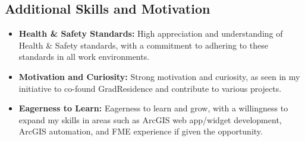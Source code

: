 \documentclass{article}
\begin{document}
\subsection*{Additional Skills and Motivation}
\begin{itemize}
    \item \textbf{Health \& Safety Standards:} High appreciation and understanding of Health \& Safety standards, with a commitment to adhering to these standards in all work environments.
    \item \textbf{Motivation and Curiosity:} Strong motivation and curiosity, as seen in my initiative to co-found GradResidence and contribute to various projects.
    \item \textbf{Eagerness to Learn:} Eagerness to learn and grow, with a willingness to expand my skills in areas such as ArcGIS web app/widget development, ArcGIS automation, and FME experience if given the opportunity.
\end{itemize}
\end{document}
